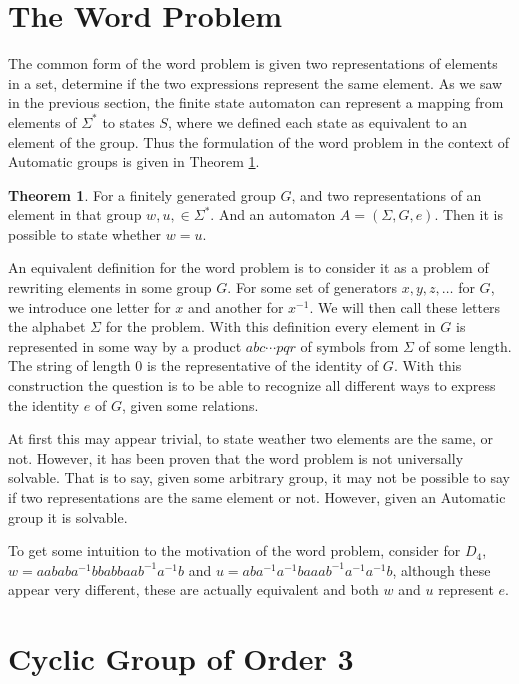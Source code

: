 \documentclass[10pt]{amsart}
\theoremstyle{definition}
\newtheorem{theorem}{Theorem}[section]
\begin{document}
\section{The Word Problem}\label{sec:the_word_problem}

The common form of the word problem is given two representations of elements in
a set, determine if the two expressions represent the same element. As we saw
in the previous section, the finite state automaton can represent a mapping
from elements of $\Sigma^*$ to states $S$, where we defined each state as
equivalent to an element of the group. Thus the formulation of the word problem
in the context of Automatic groups is given in Theorem \ref{thm:twp}.

\begin{theorem}\label{thm:twp}
  For a finitely generated group $G$, and two representations of an element in
  that group $w,u,\in\Sigma^*$. And an automaton $A=\left(\Sigma,G,e\right)$.
  Then it is possible to state whether $w=u$.
\end{theorem}

An equivalent definition for the word problem is to consider it as a problem of
rewriting elements in some group $G$. For some set of generators $x, y,
z,\ldots$ for $G$, we introduce one letter for $x$ and another for $x^{-1}$. We
will then call these letters the alphabet $\Sigma$ for the problem. With this
definition every element in $G$ is represented in some way by a product
$abc\cdots pqr$ of symbols from $\Sigma$ of some length. The string of length
$0$ is the representative of the identity of $G$. With this construction the
question is to be able to recognize all different ways to express the identity
$e$ of $G$, given some relations.

At first this may appear trivial, to state weather two elements are the same,
or not. However, it has been proven that the word problem is not universally
solvable. That is to say, given some arbitrary group, it may not be possible to
say if two representations are the same element or not. However, given an
Automatic group it is solvable.

To get some intuition to the motivation of the word problem, consider for
$D_4$, $w=aababa^{-1}bbabbaab^{-1}a^{-1}b$ and
$u=aba^{-1}a^{-1}baaab^{-1}a^{-1}a^{-1}b$, although these appear very
different, these are actually equivalent and both $w$ and $u$ represent $e$.

\section{Cyclic Group of Order 3}%
\label{sec:cyclic_group_of_order_3}
\end{document}
